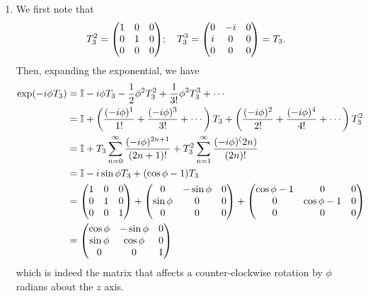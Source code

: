 \documentclass[12pt]{article}
\begin{document}
\begin{enumerate}[label=(\alph*)]
    \item We first note that
    \[ T_3^2 = \mqty(1&0&0\\0&1&0\\0&0&0); \quad T_3^3 = \mqty(0&-i&0\\i&0&0\\0&0&0) = T_3. \]
    Then, expanding the exponential, we have
    \begin{align*}
        \exp(-i\phi T_3) &= \mathbb{I} - i\phi T_3 - \frac{1}{2}\phi^2 T_3^2 + \frac{1}{3!}\phi^3 T_3^3 + \cdots \\
        &= \mathbb{I} + \left(\frac{(-i\phi)^1}{1!} + \frac{(-i\phi)^3}{3!} + \cdots\right)T_3 + \left(\frac{(-i\phi)^2}{2!} + \frac{(-i\phi)^4}{4!} + \cdots\right)T_3^2 \\
        &= \mathbb{I} + T_3\sum_{n=0}^{\infty}\frac{(-i\phi)^{2n+1}}{(2n+1)!} + T_3^2\sum_{n=1}^{\infty}\frac{(-i\phi)^(2n)}{(2n)!} \\
        &= \mathbb{I} - i\sin\phi T_3 + (\cos\phi - 1)T_3 \\
        &= \mqty(1&0&0\\0&1&0\\0&0&1) + \mqty(0&-\sin\phi&0\\\sin\phi&0&0\\0&0&0) + \mqty(\cos\phi-1&0&0\\0&\cos\phi-1&0\\0&0&0) \\
        &= \mqty(\cos\phi&-\sin\phi&0\\\sin\phi&\cos\phi&0\\0&0&1)
    \end{align*}
    which is indeed the matrix that affects a counter-clockwise rotation by $\phi$ radians about the $z$ axis.
\end{enumerate}
\end{document}
